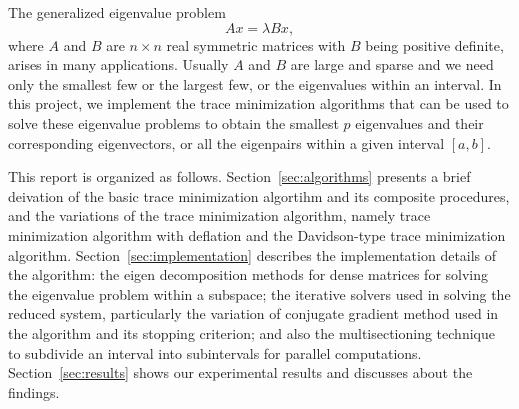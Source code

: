 The generalized eigenvalue problem
\begin{equation}
	Ax = \lambda B x,\label{eq:eig}
\end{equation}
where $A$ and $B$ are $n \times n$ real symmetric matrices with $B$ being positive definite, arises in many
applications\cite{klinvex}. Usually $A$ and $B$ are large and sparse and we need only the smallest
few or the largest few, or the eigenvalues within an interval. In this project, we implement the trace minimization
algorithms that can be used to solve these eigenvalue problems to obtain the smallest $p$ eigenvalues and their
corresponding eigenvectors, or all the eigenpairs within a given interval $[a, b]$.

This report is organized as follows. Section~\ref{sec:algorithms} presents a brief deivation of the basic trace
minimization algortihm and its composite procedures, and the variations of the trace minimization algorithm, namely
trace minimization algorithm with deflation and the Davidson-type trace minimization algorithm.
Section~\ref{sec:implementation} describes the implementation details of the algorithm: the eigen decomposition
methods for dense matrices for solving the eigenvalue problem within a subspace; the iterative solvers used in
solving the reduced system, particularly the variation of conjugate gradient method used in the algorithm and its
stopping criterion; and also the multisectioning technique to subdivide an interval into subintervals for parallel
computations. Section~\ref{sec:results} shows our experimental results and discusses about the findings.
